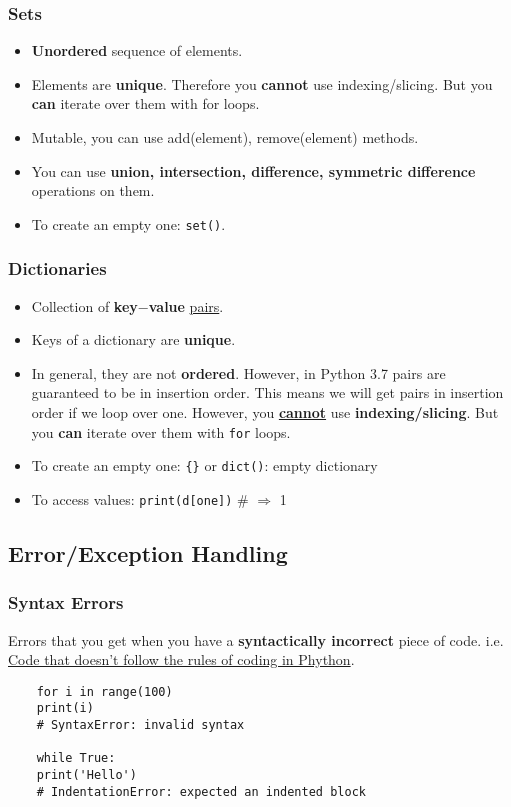 \documentclass[a4paper]{article}
\begin{document}
\subsubsection{Sets}
\begin{itemize}
    \item \textbf{Unordered} sequence of elements.
    \item Elements are \textbf{unique}.
    \subitem Therefore you \textbf{cannot} use indexing/slicing.
    \subitem But you \textbf{can} iterate over them with for loops.
    \item Mutable, you can use add(element), remove(element) methods.
    \item You can use \textbf{union, intersection, difference, symmetric difference} operations on them.
    \item To create an empty one: \texttt{set()}.
\end{itemize}

\subsubsection{Dictionaries}
        \begin{itemize}
            \item Collection of \textbf{key$-$value} \underline{pairs}.
            \item Keys of a dictionary are \textbf{unique}.
            \item In general, they are not \textbf{ordered}. 
            \subitem However, in Python 3.7 pairs are guaranteed to be in insertion order.
            \subitem This means we will get pairs in insertion order if we loop over one.
            \subitem However, you \underline{\textbf{cannot}} use \textbf{indexing/slicing}.
            \subitem But you \textbf{can} iterate over them with \texttt{for} loops.
            \item To create an empty one: \texttt{\{\}} or \texttt{dict()}: empty dictionary
            \item To access values: \texttt{print(d[\textquotesingle one\textquotesingle ])} \# $\Rightarrow$ 1
        \end{itemize}
        
\subsection{Error/Exception Handling}
\subsubsection{Syntax Errors}
Errors that you get when you have a \textbf{syntactically incorrect} piece of code. i.e. \underline{Code that doesn't follow the rules of coding in Phython}.
\begin{lstlisting}
    for i in range(100)
    print(i)
    # SyntaxError: invalid syntax
    
    while True:
    print('Hello')
    # IndentationError: expected an indented block
\end{lstlisting}{}
    
\end{document}
